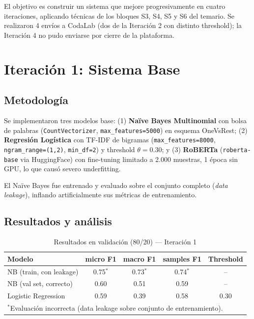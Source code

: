 \documentclass[11pt, a4paper]{article}
\begin{document}
El objetivo es construir un sistema que mejore progresivamente en cuatro iteraciones, aplicando técnicas de los bloques S3, S4, S5 y S6 del temario. Se realizaron 4 envíos a CodaLab (dos de la Iteración 2 con distinto threshold); la Iteración 4 no pudo enviarse por cierre de la plataforma.

\section{Iteración 1: Sistema Base}

\subsection{Metodología}

Se implementaron tres modelos base: (1) \textbf{Naïve Bayes Multinomial} con bolsa de palabras (\texttt{CountVectorizer}, \texttt{max\_features=5000}) en esquema OneVsRest; (2) \textbf{Regresión Logística} con TF-IDF de bigramas (\texttt{max\_features=8000}, \texttt{ngram\_range=(1,2)}, \texttt{min\_df=2}) y threshold $\theta=0.30$; y (3) \textbf{RoBERTa} (\texttt{roberta-base} via HuggingFace) con fine-tuning limitado a 2.000 muestras, 1 época sin GPU, lo que causó severo underfitting.

El Naïve Bayes fue entrenado y evaluado sobre el conjunto completo (\textit{data leakage}), inflando artificialmente sus métricas de entrenamiento.

\subsection{Resultados y análisis}

\begin{table}[H]
\centering
\caption{Resultados en validación (80/20) --- Iteración 1}
\begin{tabular}{lcccc}
\toprule
\textbf{Modelo} & \textbf{micro F1} & \textbf{macro F1} & \textbf{samples F1} & \textbf{Threshold} \\
\midrule
NB (train, con leakage) & 0.75$^*$ & 0.73$^*$ & 0.74$^*$ & -- \\
NB (val set, correcto)  & 0.60     & 0.51     & 0.59     & -- \\
Logistic Regression     & 0.59     & 0.39     & 0.58     & 0.30 \\
\bottomrule
\multicolumn{5}{l}{\small $^*$Evaluación incorrecta (data leakage sobre conjunto de entrenamiento).}
\end{tabular}
\end{table}
\end{document}
